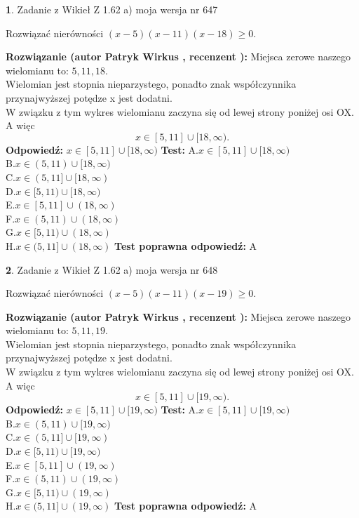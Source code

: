 \documentclass[12pt, a4paper]{article}
\theoremstyle{definition} %
\newtheorem{zad}{}
\newcommand{\zadStart}[1]{\begin{zad}#1\newline}
\newcommand{\zadStop}{\end{zad}}
\newcommand{\rozwStart}[2]{\noindent \textbf{Rozwiązanie (autor #1 , recenzent #2): }\newline}
\newcommand{\rozwStop}{\newline}
\newcommand{\odpStart}{\noindent \textbf{Odpowiedź:}\newline}
\newcommand{\odpStop}{\newline}
\newcommand{\testStart}{\noindent \textbf{Test:}\newline}
\newcommand{\testStop}{\newline}
\newcommand{\kluczStart}{\noindent \textbf{Test poprawna odpowiedź:}\newline}
\newcommand{\kluczStop}{\newline}
\begin{document}
\zadStart{Zadanie z Wikieł Z 1.62 a) moja wersja nr 647}

Rozwiązać nierówności $(x-5)(x-11)(x-18)\ge0$.
\zadStop
\rozwStart{Patryk Wirkus}{}
Miejsca zerowe naszego wielomianu to: $5, 11, 18$.\\
Wielomian jest stopnia nieparzystego, ponadto znak współczynnika przy\linebreak najwyższej potędze x jest dodatni.\\ W związku z tym wykres wielomianu zaczyna się od lewej strony poniżej osi OX. A więc $$x \in [5,11] \cup [18,\infty).$$
\rozwStop
\odpStart
$x \in [5,11] \cup [18,\infty)$
\odpStop
\testStart
A.$x \in [5,11] \cup [18,\infty)$\\
B.$x \in (5,11) \cup [18,\infty)$\\
C.$x \in (5,11] \cup [18,\infty)$\\
D.$x \in [5,11) \cup [18,\infty)$\\
E.$x \in [5,11] \cup (18,\infty)$\\
F.$x \in (5,11) \cup (18,\infty)$\\
G.$x \in [5,11) \cup (18,\infty)$\\
H.$x \in (5,11] \cup (18,\infty)$
\testStop
\kluczStart
A
\kluczStop



\zadStart{Zadanie z Wikieł Z 1.62 a) moja wersja nr 648}

Rozwiązać nierówności $(x-5)(x-11)(x-19)\ge0$.
\zadStop
\rozwStart{Patryk Wirkus}{}
Miejsca zerowe naszego wielomianu to: $5, 11, 19$.\\
Wielomian jest stopnia nieparzystego, ponadto znak współczynnika przy\linebreak najwyższej potędze x jest dodatni.\\ W związku z tym wykres wielomianu zaczyna się od lewej strony poniżej osi OX. A więc $$x \in [5,11] \cup [19,\infty).$$
\rozwStop
\odpStart
$x \in [5,11] \cup [19,\infty)$
\odpStop
\testStart
A.$x \in [5,11] \cup [19,\infty)$\\
B.$x \in (5,11) \cup [19,\infty)$\\
C.$x \in (5,11] \cup [19,\infty)$\\
D.$x \in [5,11) \cup [19,\infty)$\\
E.$x \in [5,11] \cup (19,\infty)$\\
F.$x \in (5,11) \cup (19,\infty)$\\
G.$x \in [5,11) \cup (19,\infty)$\\
H.$x \in (5,11] \cup (19,\infty)$
\testStop
\kluczStart
A
\kluczStop
\end{document}
